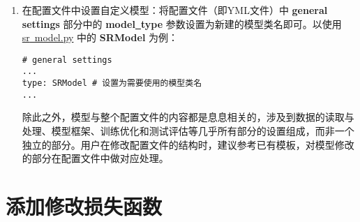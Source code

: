 \documentclass[../main.tex]{subfiles}
\begin{document}
\begin{enumerate}
    \item 在配置文件中设置自定义模型：将配置文件（即YML文件）中 \textbf{general settings} 部分中的 \textbf{model\underline{~}type} 参数设置为新建的模型类名即可。以使用 \href{https://github.com/XPixelGroup/BasicSR/tree/master/basicsr/models/sr_model.py}{sr\underline{~}model.py} 中的 \textbf{SRModel} 为例：
          \begin{verbatim}
# general settings
...
type: SRModel # 设置为需要使用的模型类名
...
\end{verbatim}
          除此之外，模型与整个配置文件的内容都是息息相关的，涉及到数据的读取与处理、模型框架、训练优化和测试评估等几乎所有部分的设置组成，而非一个独立的部分。用户在修改配置文件的结构时，建议参考已有模板，对模型修改的部分在配置文件中做对应处理。

\end{enumerate}

\section{添加修改损失函数}
\end{document}
